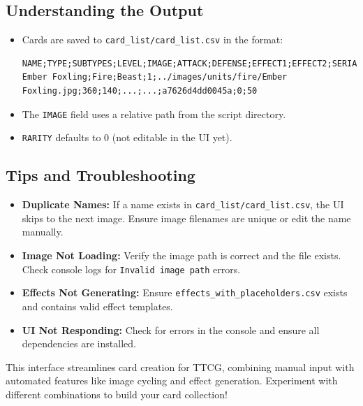\subsection{Understanding the Output}

\begin{itemize}
    \item Cards are saved to \texttt{card\_list/card\_list.csv} in the format:
\begin{lstlisting}
NAME;TYPE;SUBTYPES;LEVEL;IMAGE;ATTACK;DEFENSE;EFFECT1;EFFECT2;SERIAL;RARITY;TRANSPARENCY
Ember Foxling;Fire;Beast;1;../images/units/fire/Ember Foxling.jpg;360;140;...;...;a7626d4dd0045a;0;50
\end{lstlisting}
    \item The \texttt{IMAGE} field uses a relative path from the script directory.
    \item \texttt{RARITY} defaults to 0 (not editable in the UI yet).
\end{itemize}

\subsection{Tips and Troubleshooting}

\begin{itemize}
    \item \textbf{Duplicate Names:} If a name exists in \texttt{card\_list/card\_list.csv}, the UI skips to the next image. Ensure image filenames are unique or edit the name manually.
    \item \textbf{Image Not Loading:} Verify the image path is correct and the file exists. Check console logs for \texttt{Invalid image path} errors.
    \item \textbf{Effects Not Generating:} Ensure \texttt{effects\_with\_placeholders.csv} exists and contains valid effect templates.
    \item \textbf{UI Not Responding:} Check for errors in the console and ensure all dependencies are installed.
\end{itemize}

This interface streamlines card creation for TTCG, combining manual input with automated features like image cycling and effect generation. Experiment with different combinations to build your card collection!
